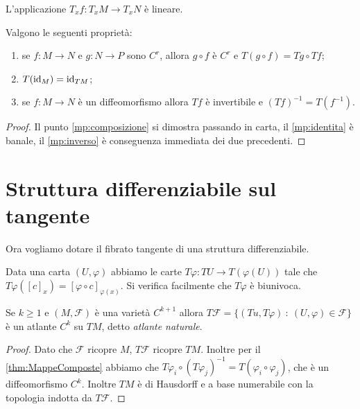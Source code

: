 \begin{remark}
	L'applicazione $T_xf:T_xM\to T_xN$ è lineare.
\end{remark}
 
\begin{theorem} \label{thm:MappeComposte} 
	Valgono le seguenti proprietà:
	\begin{enumerate}
	\item se $f:M\to N$ e $g:N\to P$ sono $C^r$, allora $g\circ f$ è $C^r$ e $T(g\circ f)=Tg\circ Tf$; \label{mp:composizione}
	\item $T(\mathrm{id}_M)=\mathrm{id}_{TM}$; \label{mp:identita}
	\item se $f:M\to N$ è un diffeomorfismo allora $Tf$ è invertibile e $(Tf)^{-1}=T(f^{-1})$. \label{mp:inverso}
	\end{enumerate}
\end{theorem}

\begin{proof}
	Il punto \ref{mp:composizione} si dimostra passando in carta, il \ref{mp:identita} è banale, il \ref{mp:inverso} è conseguenza immediata dei due precedenti.
\end{proof}

\section{Struttura differenziabile sul tangente}
Ora vogliamo dotare il fibrato tangente di una struttura differenziabile.
 
Data una carta $(U,\varphi)$ abbiamo le carte $T\varphi:TU\to T(\varphi(U))$ tale che $T\varphi([c]_x)=[\varphi\circ c]_{\varphi(x)}$. Si verifica facilmente che $T\varphi$ è biunivoca.
 
\begin{proposition} 
	Se $k\ge 1$ e $(M,\mathcal F)$ è una varietà $C^{k+1}$ allora $T\mathcal F=\{(Tu,T\varphi)\ :\ (U,\varphi)\in\mathcal F\}$ è un atlante $C^k$ su $TM$, detto \emph{atlante naturale}.
\end{proposition}

\begin{proof}
	Dato che $\mathcal F$ ricopre $M$, $T\mathcal F$ ricopre $TM$. Inoltre per il \cref{thm:MappeComposte} abbiamo che  $T\varphi_i\circ(T\varphi_j)^{-1}=T(\varphi_i\circ\varphi_j)$, che è un diffeomorfismo $C^k$.
	Inoltre $TM$ è di Hausdorff e a base numerabile con la topologia indotta da $T\mathcal F$.
\end{proof}

